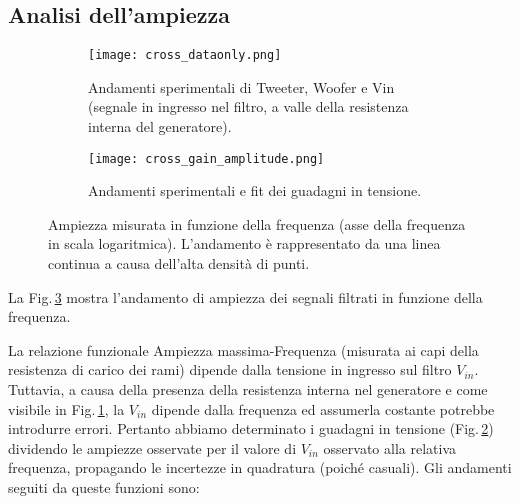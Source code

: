 \documentclass[../Relazione_circuiti]{subfiles}
\begin{document}
\subsection{Analisi dell'ampiezza}

  \begin{figure}[H]
    \centering

    \begin{subfigure}[t]{=0.49\textwidth}

      \texttt{[image: cross\_dataonly.png]}

      \caption{Andamenti sperimentali di Tweeter, Woofer e Vin (segnale in ingresso nel filtro,
        a valle della resistenza interna del generatore).}
      \label{fig: amplitude_dataonly}

    \end{subfigure}
    \hfill
    \begin{subfigure}[t]{=0.49\textwidth}

      \texttt{[image: cross\_gain\_amplitude.png]}

      \caption
      {Andamenti sperimentali e fit dei guadagni in tensione.}
      \label{fig:cross_gain}
    \end{subfigure}

    \caption{
      Ampiezza misurata in funzione della frequenza (asse della frequenza in scala logaritmica).
      L'andamento è rappresentato da una linea continua a causa dell'alta densità di punti.
    }
    \label{fig:cross_amplitude}

  \end{figure}

  La Fig.\,\ref{fig:cross_amplitude} mostra l'andamento di ampiezza dei segnali filtrati in funzione della frequenza.

  La relazione funzionale Ampiezza massima-Frequenza (misurata ai capi della resistenza di carico dei rami) dipende
  dalla tensione in ingresso sul filtro $V_{in}$.
  Tuttavia, a causa della presenza della resistenza interna nel generatore e come visibile in
  Fig.\,\ref{fig: amplitude_dataonly}, la $V_{in}$
  dipende dalla frequenza ed assumerla costante potrebbe introdurre errori.
  Pertanto abbiamo determinato i guadagni in tensione (Fig.\,\ref{fig:cross_gain}) dividendo le ampiezze osservate per
  il valore di $V_{in}$
  osservato alla relativa frequenza, propagando le incertezze in quadratura (poiché casuali).
  Gli andamenti seguiti da queste funzioni sono:
\end{document}
